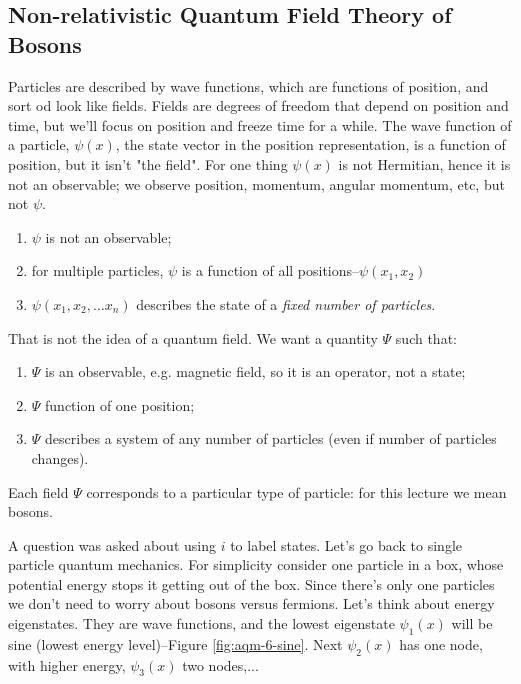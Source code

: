 \documentclass[]{article}
\begin{document}
\subsection{Non-relativistic Quantum Field Theory of Bosons}

Particles are described by wave functions, which are functions of position, and sort od look like fields. Fields are degrees of freedom that depend on position and time, but we'll focus on position and freeze time for a while. The wave function of a particle, $\psi(x)$, the state vector in the position representation, is a function of position, but it isn't "the field". For one thing $\psi(x)$ is not Hermitian, hence it is not an observable; we observe position, momentum, angular momentum, etc, but not $\psi$.
\begin{enumerate}
	\item $\psi$ is not an observable;
	\item for multiple particles, $\psi$ is a function of all positions--$\psi(x_1,x_2)$
	\item $\psi(x_1,x_2,...x_n)$ describes the state of a \emph{fixed number of particles}.
\end{enumerate}

 That is not the idea of a quantum field. We want a quantity $\Psi$ such that:

\begin{enumerate}
	\item $\Psi$ is an observable, e.g. magnetic field, so it is an operator, not a state;
	\item $\Psi$ function of one position;
	\item $\Psi$ describes a system of any number of particles (even if number of particles changes).
\end{enumerate}

Each field $\Psi$ corresponds to a particular type of particle: for this lecture we mean bosons.

A question was asked about using $i$ to label states. Let's go back to single particle quantum mechanics. For simplicity consider one particle in a box, whose potential energy stops it getting out of the box. Since there's only one particles we don't need to worry about bosons versus fermions. Let's think about energy eigenstates. They are wave functions, and the lowest eigenstate $\psi_1(x)$ will be sine (lowest energy level)--Figure \ref{fig:aqm-6-sine}. Next $\psi_2(x)$ has one node, with higher energy, $\psi_3(x)$ two nodes,...
\end{document}
